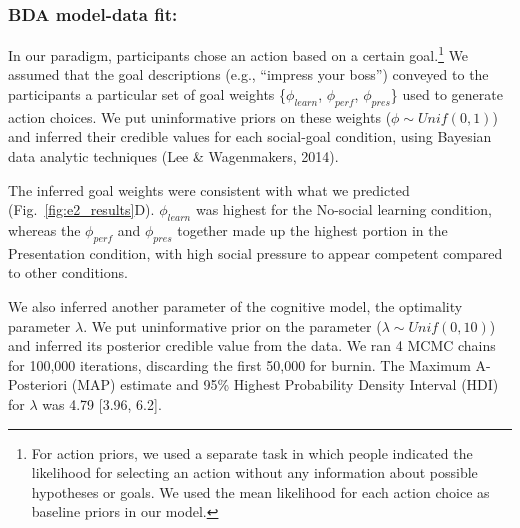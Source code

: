 \documentclass[10pt, letterpaper]{article}
\begin{document}
\subsubsection{BDA model-data fit:}\label{bda-model-data-fit}

In our paradigm, participants chose an action based on a certain
goal.\footnote{For action priors, we used a separate task in which people indicated the likelihood for selecting an action without any information about possible hypotheses or goals. We used the mean likelihood for each action choice as baseline priors in our model.}
We assumed that the goal descriptions (e.g., ``impress your boss'')
conveyed to the participants a particular set of goal weights
\{\(\phi_{learn}\), \(\phi_{perf}\), \(\phi_{pres}\)\} used to generate
action choices. We put uninformative priors on these weights
(\(\phi \sim Unif(0,1)\)) and inferred their credible values for each
social-goal condition, using Bayesian data analytic techniques (Lee \&
Wagenmakers, 2014).

The inferred goal weights were consistent with what we predicted
(Fig.~\ref{fig:e2_results}D). \(\phi_{learn}\) was highest for the
No-social learning condition, whereas the \(\phi_{perf}\) and
\(\phi_{pres}\) together made up the highest portion in the Presentation
condition, with high social pressure to appear competent compared to
other conditions.

We also inferred another parameter of the cognitive model, the
optimality parameter \(\lambda\). We put uninformative prior on the
parameter (\(\lambda \sim Unif(0,10)\)) and inferred its posterior
credible value from the data. We ran 4 MCMC chains for 100,000
iterations, discarding the first 50,000 for burnin. The Maximum A-
Posteriori (MAP) estimate and 95\% Highest Probability Density Interval
(HDI) for \(\lambda\) was 4.79 {[}3.96, 6.2{]}.
\end{document}
